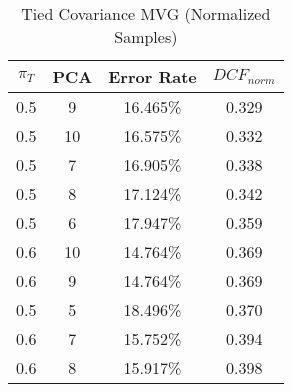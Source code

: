 \begin{longtable}{|c|c|c|c|}
\caption{Tied Covariance MVG (Normalized Samples)}\label{tab:mvgn_tiedcov}\\
\hline
$\pi_T$ & PCA & Error Rate & $DCF_{norm}$\\
\hline
0.5 & 9 & 16.465\% & 0.329\\
\hline
0.5 & 10 & 16.575\% & 0.332\\
\hline
0.5 & 7 & 16.905\% & 0.338\\
\hline
0.5 & 8 & 17.124\% & 0.342\\
\hline
0.5 & 6 & 17.947\% & 0.359\\
\hline
0.6 & 10 & 14.764\% & 0.369\\
\hline
0.6 & 9 & 14.764\% & 0.369\\
\hline
0.5 & 5 & 18.496\% & 0.370\\
\hline
0.6 & 7 & 15.752\% & 0.394\\
\hline
0.6 & 8 & 15.917\% & 0.398\\
\hline
\end{longtable}
